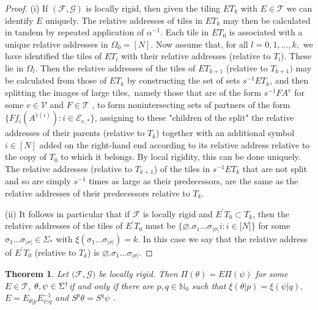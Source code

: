 \documentclass{amsproc}
\newtheorem{theorem}{Theorem}
\theoremstyle{plain}
\theoremstyle{definition}
\numberwithin{equation}{section}
\begin{document}
\begin{proof}
(i) If $(\mathcal{F},\mathcal{G})$ is locally rigid, then given the tiling $%
ET_{k}$ with $E\in\mathcal{T}$ we can identify $E$ uniquely. The relative
addresses of tiles in $ET_{k}$ may then be calculated in tandem by repeated
application of $\alpha^{-1}$. Each tile in $ET_{0}$ is associated with a
unique relative addresses in $\Omega_{0}=[N]$. Now assume that, for all $%
l=0,1,...,k,$ we have identified the tiles of $ET_{l}$ with their relative
addresses (relative to $T_{l}$). These lie in $\Omega_{l}$. Then the
relative addresses of the tiles of $ET_{k+1}$ (relative to $T_{k+1})$ may be
calculated from those of $ET_{k}$ by constructing the set of sets $%
s^{-1}ET_{k}$, and then splitting the images of large tiles$,$ namely those
that are of the form $s^{-1}FA^{v}$ for some $v\in\mathcal{V}$ and $F\in%
\mathcal{T}$ , to form nonintersecting sets of partners of the form $%
\{Ff_{i}(A^{\overleftarrow{v}(i)}):i\in\mathcal{E}_{v,\ast}\}$, assigning to
these "children of the split" the relative addresses of their parents
(relative to $T_{k}$) together with an additional symbol $i\in\left[ N\right]
$ added on the right-hand end according to its relative address relative to
the copy of $T_{0}$ to which it belongs. By local rigidity, this can be done
uniquely. The relative addresses (relative to $T_{k+1}$) of the tiles in $%
s^{-1}ET_{k}$ that are not split and so are simply $s^{-1}$ times as large
as their predecessors, are the same as the relative addresses of their
predecessors relative to $T_{k}.$

(ii) It follows in particular that if $\mathcal{F}$ is locally rigid and $%
E^{\prime}T_{0}\subset T_{k}$, then the relative addresses of the tiles of $%
E^{\prime}T_{0}$ must be $\{\varnothing.\sigma_{1}...\sigma_{\left\vert
\sigma\right\vert }i:i\in\lbrack N]\}$ for some $\sigma_{1}...\sigma
_{\left\vert \sigma\right\vert }\in\Sigma_{\ast}$ with $\xi(\sigma
_{1}...\sigma_{\left\vert \sigma\right\vert })=k$. In this case we say that
the relative address of $E^{\prime}T_{0}$ (relative to $T_{k}$) is $%
\varnothing.\sigma_{1}...\sigma_{\left\vert \sigma\right\vert }$.
\end{proof}

\begin{theorem}
\label{main}Let $(\mathcal{F},\mathcal{G)}$ be locally rigid. Then $\Pi
(\theta)=E\Pi(\psi)$ for some $E\in\mathcal{T}$, $\theta,\psi\in\Sigma^{%
\dag} $if and only if there are $p,q\in\mathbb{N}_{0}$ such that $\xi(\theta
|p)=\xi(\psi|q),$ $E=E_{\theta|p}E_{\psi|q}^{-1}$ and $S^{p}\theta=S^{q}\psi$%
.
\end{theorem}
\end{document}
